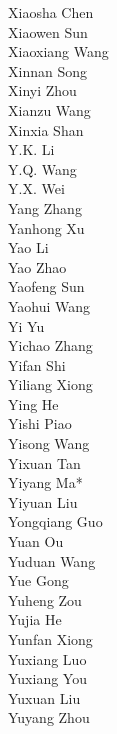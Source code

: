\documentclass[11pt, a4paper, logo, copyright, nonumbering]{deepseek}
\begin{document}
\begin{multicols}{2}
\color{damaiblue} Xiaosha Chen \\
\color{damaiblue} Xiaowen Sun \\
\color{damaiblue} Xiaoxiang Wang \\
\color{damaiblue} Xinnan Song \\
\color{damaiblue} Xinyi Zhou \\
\color{damaiblue} Xianzu Wang \\
\color{damaiblue} Xinxia Shan \\
\color{damaiblue} Y.K. Li \\
\color{damaiblue} Y.Q. Wang \\
\color{damaiblue} Y.X. Wei \\
\color{damaiblue} Yang Zhang \\
\color{damaiblue} Yanhong Xu \\
\color{damaiblue} Yao Li \\
\color{damaiblue} Yao Zhao \\
\color{damaiblue} Yaofeng Sun \\
\color{damaiblue} Yaohui Wang \\
\color{damaiblue} Yi Yu \\
\color{damaiblue} Yichao Zhang \\
\color{damaiblue} Yifan Shi \\
\color{damaiblue} Yiliang Xiong \\
\color{damaiblue} Ying He \\
\color{damaiblue} Yishi Piao \\
\color{damaiblue} Yisong Wang \\
\color{damaiblue} Yixuan Tan \\
\color{damaiblue} Yiyang Ma* \\
\color{damaiblue} Yiyuan Liu \\
\color{damaiblue} Yongqiang Guo \\
\color{damaiblue} Yuan Ou \\
\color{damaiblue} Yuduan Wang \\
\color{damaiblue} Yue Gong \\
\color{damaiblue} Yuheng Zou \\
\color{damaiblue} Yujia He \\
\color{damaiblue} Yunfan Xiong \\
\color{damaiblue} Yuxiang Luo \\
\color{damaiblue} Yuxiang You \\
\color{damaiblue} Yuxuan Liu \\
\color{damaiblue} Yuyang Zhou \\

\end{multicols}
\end{document}
